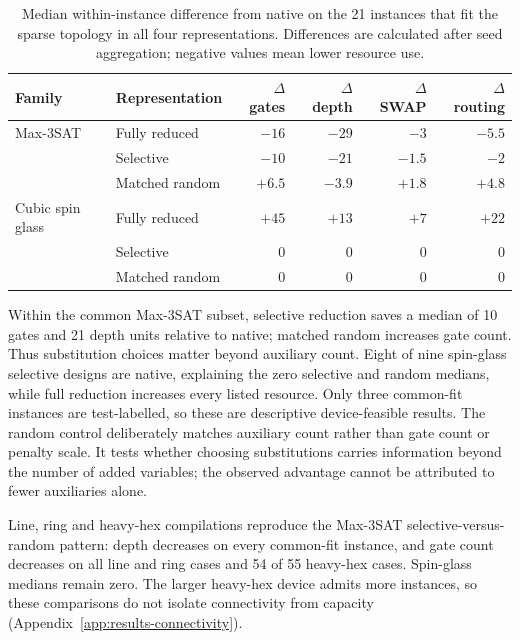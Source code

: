 \documentclass[a4paper,onecolumn,11pt,unpublished]{quantumarticle}
\theoremstyle{remark}
\begin{document}
\begin{table}[!htbp]
    \centering
    \small
    \caption{Median within-instance difference from native on the 21 instances
    that fit the sparse topology in all four representations.  Differences are
    calculated after seed aggregation; negative values mean lower resource
    use.}
    \label{tab:e2-sparse-common-paired}
    \begin{tabular}{@{}llrrrr@{}}
        \toprule
        Family & Representation
        & $\Delta$ gates & $\Delta$ depth & $\Delta$ SWAP & $\Delta$ routing\\
        \midrule
        Max-3SAT & Fully reduced  & $-16$ & $-29$ & $-3$   & $-5.5$\\
                 & Selective      & $-10$ & $-21$ & $-1.5$ & $-2$\\
                 & Matched random & $+6.5$ & $-3.9$ & $+1.8$ & $+4.8$\\
        \addlinespace
        Cubic spin glass & Fully reduced  & $+45$ & $+13$ & $+7$ & $+22$\\
                         & Selective      & $0$   & $0$   & $0$  & $0$\\
                         & Matched random & $0$   & $0$   & $0$  & $0$\\
        \bottomrule
    \end{tabular}

\end{table}

Within the common Max-3SAT subset, selective reduction saves a median of
10 gates and 21 depth units relative to native; matched random increases
gate count. Thus substitution choices matter beyond auxiliary count.
Eight of nine spin-glass selective designs are native, explaining the zero
selective and random medians, while full reduction increases every listed
resource. Only three common-fit instances are test-labelled, so these are
descriptive device-feasible results.
The random control deliberately matches auxiliary count rather than gate
count or penalty scale. It tests whether choosing substitutions carries
information beyond the number of added variables; the observed advantage
cannot be attributed to fewer auxiliaries alone.

Line, ring and heavy-hex compilations reproduce the Max-3SAT
selective-versus-random pattern: depth decreases on every common-fit
instance, and gate count decreases on all line and ring cases and 54 of 55
heavy-hex cases. Spin-glass medians remain zero. The larger heavy-hex device
admits more instances, so these comparisons do not isolate connectivity
from capacity (Appendix~\ref{app:results-connectivity}).
\end{document}
